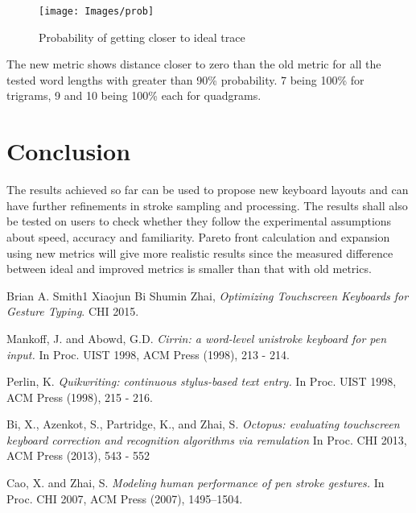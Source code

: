 \documentclass[12pt]{article}
\begin{document}
 
\begin{figure}[h!]
	\centering
	\texttt{[image: Images/prob]}
	\caption{Probability of getting closer to ideal trace}
\end{figure}
 
 

The new metric shows distance closer to zero than the old metric for all the tested word lengths with greater than 90\% probability. 7 being 100\% for trigrams, 9 and 10 being 100\% each for quadgrams.

\section{Conclusion}
The results achieved so far can be used to propose new keyboard layouts and can have further refinements in stroke sampling and processing. The results shall also be tested on users to check whether they follow the experimental assumptions about speed, accuracy and familiarity. Pareto front calculation and expansion using new metrics will give more realistic results since the measured difference between ideal and improved metrics is smaller than that with old metrics.


\begin{thebibliography}{10}
Brian A. Smith1 Xiaojun Bi Shumin Zhai,
\textit{Optimizing Touchscreen Keyboards for Gesture Typing}. 
CHI 2015.
 
Mankoff, J. and Abowd, G.D.  
\textit{Cirrin: a word-level unistroke keyboard for pen input.}
In Proc. UIST 1998, ACM Press (1998), 213 - 214.
 
Perlin, K. 
\textit{Quikwriting: continuous stylus-based text entry.} 
In Proc. UIST 1998, ACM Press (1998), 215 - 216.

Bi, X., Azenkot, S., Partridge, K., and Zhai, S. 
\textit{Octopus: evaluating touchscreen keyboard correction and recognition algorithms via remulation}
In Proc. CHI 2013, ACM Press (2013), 543 - 552

Cao, X. and Zhai, S. 
\textit{Modeling human performance of pen stroke gestures.}
In Proc. CHI 2007, ACM Press (2007), 1495–1504.

\end{thebibliography}
\end{document}
